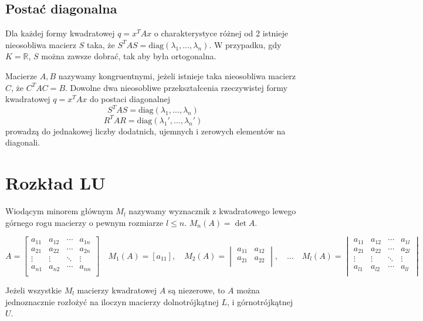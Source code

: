 \documentclass{../notatki}
\begin{document}
\subsection{Postać diagonalna}

Dla każdej formy kwadratowej $q = x^TAx$ o charakterystyce różnej od 2
istnieje nieosobliwa macierz $S$ taka, że $S^TAS = \textrm{diag}(\lambda_1,
\dots, \lambda_n)$. W przypadku, gdy $K = \mathbb{R}$, $S$ można zawsze dobrać,
tak aby była ortogonalna.

Macierze $A, B$ nazywamy kongruentnymi, jeżeli istnieje taka
nieosobliwa macierz $C$, że $C^TAC = B$. Dowolne dwa nieosobliwe przekształcenia
rzeczywistej formy kwadratowej $q = x^TAx$ do postaci diagonalnej
$$
S^TAS = \textrm{diag}(\lambda_1, \dots, \lambda_n)
$$
$$
R^TAR = \textrm{diag}(\lambda_1', \dots, \lambda_n')
$$
prowadzą do jednakowej liczby dodatnich, ujemnych i zerowych
elementów na diagonali.

\section{Rozkład LU}

Wiodącym minorem głównym $M_l$ nazywamy wyznacznik z kwadratowego
lewego górnego rogu macierzy o pewnym rozmiarze $l \leq n$. $M_n(A) = \det A$.

$$
A =
\begin{bmatrix}
  a_{11} & a_{12} & \cdots & a_{1n} \\
  a_{21} & a_{22} & \cdots & a_{2n} \\
  \vdots & \vdots & \ddots & \vdots \\
  a_{n1} & a_{n2} & \cdots & a_{nn} \\
\end{bmatrix}
\quad
M_1(A) = \left[a_{11}\right],
\quad
M_2(A) =
\begin{vmatrix}
  a_{11} & a_{12} \\
  a_{21} & a_{22} \\
\end{vmatrix},
\quad
\dots
\quad
M_l(A) =
\begin{vmatrix}
  a_{11} & a_{12} & \cdots & a_{1l} \\
  a_{21} & a_{22} & \cdots & a_{2l} \\
  \vdots & \vdots & \ddots & \vdots \\
  a_{l1} & a_{l2} & \cdots & a_{ll} \\
\end{vmatrix}
$$

Jeżeli wszystkie $M_l$ macierzy kwadratowej $A$ są niezerowe, to $A$ można
jednoznacznie rozłożyć na iloczyn macierzy dolnotrójkątnej $L$, i
górnotrójkątnej $U$.
\end{document}
